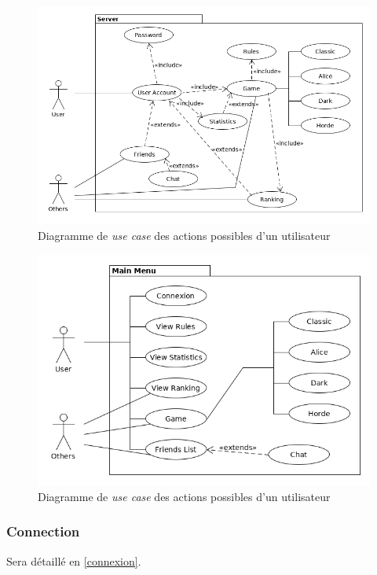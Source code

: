 \documentclass[10pt, a4paper]{article}
\begin{document}
\begin{figure}[ht]
\centering
\includegraphics[scale=0.4]{UC_useractions.png}
\caption{Diagramme de \textit{use case} des actions possibles d'un utilisateur}
\label{UC_act} %
\end{figure}

\begin{figure}[ht]
\centering
\includegraphics[scale=0.4]{UC_mainmenu.png}
\caption{Diagramme de \textit{use case} des actions possibles d'un utilisateur}
\label{UC_menu} %
\end{figure}

\subsubsection{Connection}
Sera détaillé en \ref{connexion}.
\end{document}

